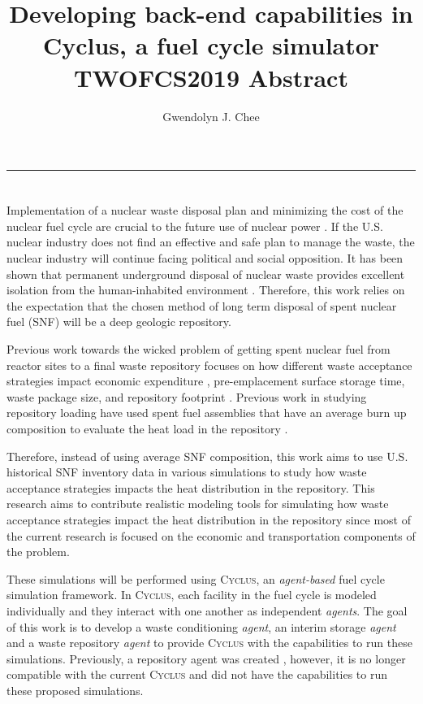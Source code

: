 \documentclass[11pt, letterpaper]{article}
\title{Developing back-end capabilities in Cyclus, a fuel cycle simulator
        \\ \vspace{0.5em} TWOFCS2019 Abstract}
\author{Gwendolyn J. Chee}
\renewcommand *\footnoterule{}
\begin{document}
	\maketitle
	\hrule

\section * {}
\doublespacing
Implementation of a nuclear waste disposal plan and minimizing the cost of the 
nuclear fuel cycle are crucial to the future use of nuclear power 
\cite{massachusetts_institute_of_technology_future_2003}. 
If the U.S. nuclear industry does not find an effective and safe plan to manage 
the waste, the nuclear industry will continue facing political and social 
opposition. 
It has been shown that permanent underground disposal of nuclear waste provides
excellent isolation from the human-inhabited environment 
\cite{rechard_evolution_2014}. 
Therefore, this work relies on the expectation that the chosen method of long 
term disposal of spent nuclear fuel (SNF) will be a deep geologic repository. 

Previous work towards the wicked problem of getting spent nuclear fuel from reactor 
sites to a final waste repository focuses on how different waste acceptance strategies 
impact economic expenditure \cite{nesbit_proposed_2015}, pre-emplacement 
surface storage time, waste package size, and repository 
footprint \cite{greenberg_application_2012}. 
Previous work in studying repository loading have used spent fuel assemblies 
that have an average burn up composition \cite{johnson_optimizing_2016} 
to evaluate the heat load in the repository \cite{greenberg_application_2012}. 

Therefore, instead of using average SNF composition, this work aims to use U.S. 
historical SNF inventory data \cite{peterson_unf_standards_2017} in various 
simulations to study how waste acceptance strategies impacts the heat distribution
in the repository. 
This research aims to contribute realistic modeling tools for simulating how 
waste acceptance strategies impact the heat distribution in the repository 
since most of the current research is focused on the economic and 
transportation components of the problem. 

These simulations will be performed using \textsc{Cyclus}, an 
\textit{agent-based} fuel cycle simulation framework. 
In \textsc{Cyclus}, each facility in the fuel cycle is modeled individually 
and they interact with one another as independent \textit{agents}. 
The goal of this work is to develop a waste conditioning \textit{agent}, 
an interim storage \textit{agent} and a waste repository \textit{agent} 
to provide \textsc{Cyclus} with the capabilities to run these simulations. 
Previously, a repository agent was created \cite{huff_cyclus_2013}, however, 
it is no longer compatible with the current \textsc{Cyclus} and 
did not have the capabilities to run these proposed simulations.  
\end{document}
